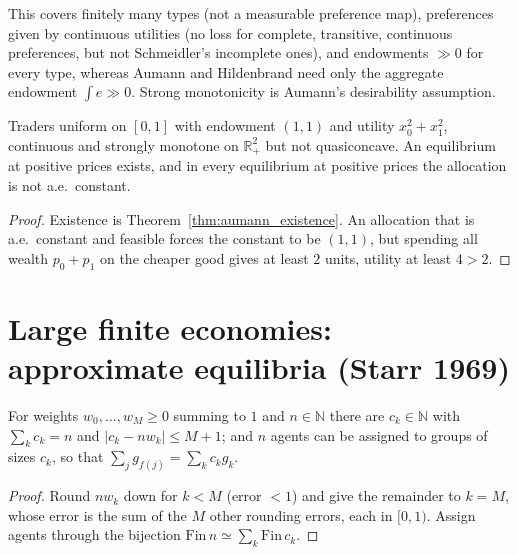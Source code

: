 \begin{remark}
This covers finitely many types (not a measurable preference map), preferences given by continuous utilities (no loss
for complete, transitive, continuous preferences, but not Schmeidler's incomplete ones), and endowments $\gg 0$ for every
type, whereas Aumann and Hildenbrand need only the aggregate endowment $\int e \gg 0$. Strong monotonicity is Aumann's
desirability assumption.
\end{remark}

\begin{theorem}
\label{thm:aumann_existence_witness}
\leanok
{}
Traders uniform on $[0,1]$ with endowment $(1,1)$ and utility $x_0^2 + x_1^2$, continuous and strongly monotone on
$\mathbb{R}^2_+$ but not quasiconcave. An equilibrium at positive prices exists, and in every equilibrium at positive
prices the allocation is not a.e.\ constant.
\end{theorem}
\begin{proof}
\leanok
Existence is Theorem~\ref{thm:aumann_existence}. An allocation that is a.e.\ constant and feasible forces the constant
to be $(1,1)$, but spending
all wealth $p_0 + p_1$ on the cheaper good gives at least $2$ units, utility at least $4 > 2$.
\end{proof}

\section{Large finite economies: approximate equilibria (Starr 1969)}
\label{sec:approx_equilibrium}

\begin{lemma}
\label{lem:rounding_counts}
\leanok
For weights $w_0, \dots, w_M \ge 0$ summing to $1$ and $n \in \mathbb{N}$ there are $c_k \in \mathbb{N}$ with
$\sum_k c_k = n$ and $|c_k - n w_k| \le M + 1$; and $n$ agents can be assigned to groups of sizes $c_k$, so that
$\sum_j g_{f(j)} = \sum_k c_k g_k$.
\end{lemma}
\begin{proof}
\leanok
Round $n w_k$ down for $k < M$ (error $< 1$) and give the remainder to $k = M$, whose error is the sum of the $M$
other rounding errors, each in $[0,1)$.
Assign agents through the bijection $\mathrm{Fin}\,n \simeq \sum_k \mathrm{Fin}\,c_k$.
\end{proof}

